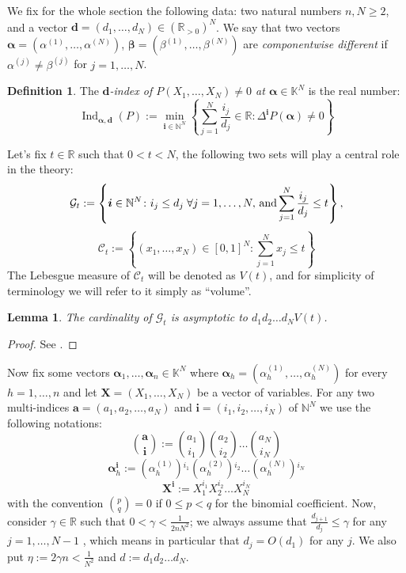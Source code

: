 \documentclass[10 pt,a4paper]{article}
\theoremstyle{plain}
\newtheorem{lem}[thm]{Lemma}
\theoremstyle{definition}
\newtheorem{defn}[thm]{Definition}
\theoremstyle{named}
\newcommand{\sC}{\mathcal{C}}
\newcommand{\sG}{\mathcal{G}}
\DeclareMathOperator{\Ind}{Ind}
\begin{document}
We fix for the whole section the following data: two natural numbers $n,N\ge 2$, and  a vector $\bm{d}=(d_1,\ldots ,d_N)\in(\mathbb R_{>0})^N$.  We say that two vectors  $\bm{\alpha}=(\alpha^{(1)},\ldots,\alpha^{(N)})$, $\bm{\beta}=(\beta^{(1)},\ldots,\beta^{(N)})$  are \emph{componentwise different} if $\alpha^{(j)}\neq\beta^{(j)}$ for  $j=1,\ldots, N$.
\begin{defn}  The \emph{$\bm{d}$-index of $P(X_1,\dots ,X_N)\neq 0$ at $\bm{\alpha}\in\mathbb K^N$} is the real number:
$$
\Ind_{\bm{\alpha},\bm{d}}(P):=\min_{\bm i\in \mathbb N^N}\left\{\sum_{j=1}^{N}\frac{i_j}{d_j}\in\mathbb R\colon \Delta^{\bm i}P(\bm{\alpha})\neq 0\right \}
$$
\end{defn}
Let's fix  $t\in\mathbb R$ such that $0<t<N$, the following two sets will play a central role in the theory:
$$
\sG_t:=\left \{\bm i\in \mathbb N^N\colon i_j\leq d_j\; \forall j=1,\dots ,N,\, {\rm{and}}\sum_{j=1}^{N}\frac{i_j}{d_j}\leq t\right \},
$$
$$
\sC_t:=\left\{(x_1,\dots ,x_N)\in [0,1]^N \colon \sum_{j=1}^{N}x_j \leq t \right \}
$$
The Lebesgue measure of $\sC_t$ will be denoted as $V(t)$, and for simplicity of terminology we will refer to it simply as ``volume''.

\begin{lem}\label{Lemmepagina156}  The cardinality of  $\sG_t$  is asymptotic to $d_1 d_2\ldots d_N V(t)$.
\end{lem}
\begin{proof}See \cite[p. 157]{bogu}.
\end{proof}


Now fix some vectors $\bm{\alpha}_1,\ldots,\bm{\alpha}_n\in\mathbb K^N$ where $\bm{\alpha}_h=(\alpha^{(1)}_h,\ldots,\alpha^{(N)}_h)$ for every $h=1,\ldots, n$ and let  $\bm{X}=(X_1,\ldots,X_N)$ be a vector of variables. For any two multi-indices  $\bm {a}=(a_1,a_2,\dots ,a_N)$ and $\bm {i}=(i_{1},i_{2},\dots ,i_{N})$ of $\mathbb N^{N}$ we use the following notations:
$$
{\bm a\choose \bm i}:={{{a_1}}\choose {i_1}}  {{{a_2}} \choose {i_2}} \ldots {{{a_N}}\choose {i_N}}
$$
$$
\bm{\alpha}_h^{\bm i}:=(\alpha_{h}^{(1)}){^{{i_1}}}  ({\alpha}_{h}^{(2)}){^{{i_2}}}\ldots (\alpha_{h}^{(N)}){^{{i_N}}}
$$
$$
\bm{X}^{\bm i}:=X^{i_1}_1X^{i_2}_2\ldots X^{i_N}_N
$$
with the convention ${{{p}}\choose {q}}=0$ if $0\leq p<q$ for the binomial coefficient. Now, consider $\gamma\in\mathbb R$ such that $0<\gamma<\frac{1}{2nN^2}$; we always assume that $\frac{d_{j+1}}{d_j}\le\gamma$ for any $j=1,\ldots, N-1$ , which means in particular that  $d_j=O(d_1)$ for any $j$. We also put $\eta:=2\gamma n < \frac{1}{N^2}$ and $d:=d_1d_2\ldots d_N$.
\end{document}
